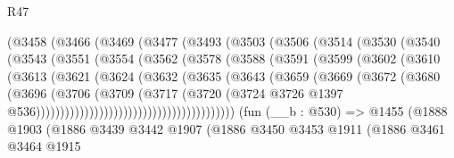\begin{lexlean}{R47}
\begin{coremodule}
              (@3458
                (@3466
                  (@3469
                    (@3477
                      (@3493
                        (@3503
                          (@3506
                            (@3514
                              (@3530
                                (@3540
                                  (@3543
                                    (@3551
                                      (@3554
                                        (@3562
                                          (@3578
                                            (@3588
                                              (@3591
                                                (@3599
                                                  (@3602
                                                    (@3610
                                                      (@3613
                                                        (@3621
                                                          (@3624
                                                            (@3632
                                                              (@3635
                                                                (@3643
                                                                  (@3659
                                                                    (@3669
                                                                      (@3672
                                                                        (@3680
                                                                          (@3696
                                                                            (@3706
                                                                              (@3709
                                                                                (@3717
                                                                                  (@3720
                                                                                    (@3724
                                                                                      @3726
                                                                                      @1397
                                                                                      @536)))))))))))))))))))))))))))))))))))))))))
    (fun (__b : @530) =>
    @1455
      (@1888
        @1903
        (@1886
          @3439
          @3442
          @1907
          (@1886
            @3450
            @3453
            @1911
            (@1886
              @3461
              @3464
              @1915

\end{coremodule}
\end{lexlean}
